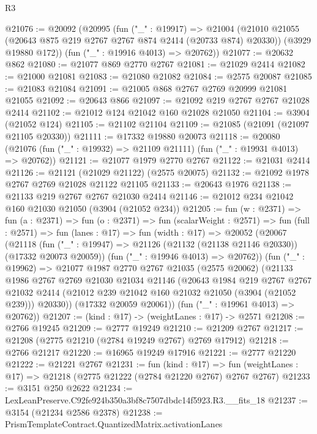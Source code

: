 \begin{lexlean}{R3}
\begin{coremodule}
@21076 := @20092
    (@20995
      (fun ("_" : @19917) =>
      @21004
        (@21010 @21055 (@20643 @875 @219 @2767 @2767 @874 @2414 (@20733 @874) @20330))
        (@3929 @19880 @172))
      (fun ("_" : @19916 @4013) => @20762))
@21077 := @20632 @862
@21080 := @21077 @869 @2770 @2767
@21081 := @21029 @2414
@21082 := @21000 @21081
@21083 := @21080 @21082
@21084 := @2575 @20087
@21085 := @21083 @21084
@21091 := @21005 @868 @2767 @2769 @20999 @21081 @21055
@21092 := @20643 @866
@21097 := @21092 @219 @2767 @2767 @21028 @2414
@21102 := @21012 @124 @21042 @160 @21028 @21050
@21104 := @3904 (@21052 @124)
@21105 := @21102 @21104
@21109 := @21085 (@21091 (@21097 @21105 @20330))
@21111 := @17332 @19880 @20073
@21118 := @20080 (@21076 (fun ("_" : @19932) => @21109 @21111) (fun ("_" : @19931 @4013) => @20762))
@21121 := @21077 @1979 @2770 @2767
@21122 := @21031 @2414
@21126 := @21121 (@21029 @21122) (@2575 @20075)
@21132 := @21092 @1978 @2767 @2769 @21028 @21122 @21105
@21133 := @20643 @1976
@21138 := @21133 @219 @2767 @2767 @21030 @2414
@21146 := @21012 @234 @21042 @160 @21030 @21050 (@3904 (@21052 @234))
@21205 := fun (w : @2371) =>
  fun (a : @2371) =>
  fun (o : @2371) =>
  fun (scalarWeight : @2571) =>
  fun (full : @2571) =>
  fun (lanes : @17) =>
  fun (width : @17) =>
  @20052
    (@20067
      (@21118
        (fun ("_" : @19947) => @21126 (@21132 (@21138 @21146 @20330)) (@17332 @20073 @20059))
        (fun ("_" : @19946 @4013) => @20762))
      (fun ("_" : @19962) =>
      @21077
        @1987
        @2770
        @2767
        @21035
        (@2575 @20062)
        (@21133
          @1986
          @2767
          @2769
          @21030
          @21034
          @21146
          (@20643
            @1984
            @219
            @2767
            @2767
            @21032
            @2414
            (@21012 @239 @21042 @160 @21032 @21050 (@3904 (@21052 @239)))
            @20330))
        (@17332 @20059 @20061))
      (fun ("_" : @19961 @4013) => @20762))
@21207 := (kind : @17) -> (weightLanes : @17) -> @2571
@21208 := @2766 @19245
@21209 := @2777 @19249
@21210 := @21209 @2767
@21217 := @21208 (@2775 @21210 (@2784 @19249 @2767) @2769 @17912)
@21218 := @2766 @21217
@21220 := @16965 @19249 @17916
@21221 := @2777 @21220
@21222 := @21221 @2767
@21231 := fun (kind : @17) =>
  fun (weightLanes : @17) => @21218 (@2775 @21222 (@2784 @21220 @2767) @2767 @2767)
@21233 := @3151 @250 @2622
@21234 := LexLeanPreserve.C92fe924b350a3bf8c7507dbdc14f5923.R3.__fits_18
@21237 := @3154 (@21234 @2586 @2378)
@21238 := PrismTemplateContract.QuantizedMatrix.activationLanes

\end{coremodule}
\end{lexlean}
